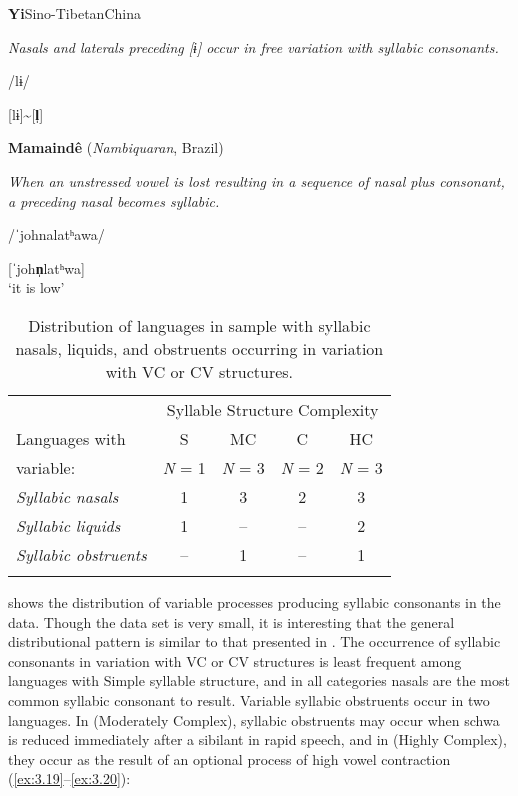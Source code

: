 \ea\label{ex:3.17}
 \textbf{Yi}{Sino-Tibetan}{China}

\textit{Nasals and laterals preceding [ɨ] occur in free variation with syllabic consonants.}

/lɨ/

[lɨ]{\textasciitilde}[\textbf{l̩}]
\citep[31]{Gerner2013}
\z

\ea\label{ex:3.18}
   \textbf{Mamaindê} (\textit{Nambiquaran}, Brazil)

\textit{When an unstressed vowel is lost resulting in a sequence of nasal plus consonant, a preceding nasal becomes syllabic.}

/ˈjohnalatʰawa/

[ˈjoh\textbf{n̩}latʰwa]\\
\glt ‘it is low’
\citep[262-263]{Eberhard2009}
\z

\begin{table}
\begin{tabular}{lcccc}
\lsptoprule
 & \multicolumn{4}{c}{Syllable Structure Complexity}\\\cmidrule(lr){2-5}
 Languages with  & S & MC & C & HC\\
   variable:     &   \textit{N} = 1 & \textit{N} = 3 &  \textit{N} = 2 & \textit{N} = 3\\\midrule
 \textit{Syllabic nasals}     & 1 & 3 & 2 & 3\\
 \textit{Syllabic liquids}    & 1 & -- & -- & 2\\
 \textit{Syllabic obstruents} & -- & 1 & -- & 1\\
\lspbottomrule
\end{tabular}
\caption{\label{tab:3.7}Distribution of languages in sample with syllabic nasals, liquids, and obstruents occurring in variation with VC or CV structures.}
\end{table}

   shows the distribution of variable processes producing syllabic consonants in the data. Though the data set is very small, it is interesting that the general distributional pattern is similar to that presented in . The occurrence of syllabic consonants in variation with VC or CV structures is least frequent among languages with Simple syllable structure, and in all categories nasals are the most common syllabic consonant to result. Variable syllabic obstruents occur in two languages. In  (Moderately Complex), syllabic obstruents may occur when schwa is reduced immediately after a sibilant in rapid speech, and in  (Highly Complex), they occur as the result of an optional process of high vowel contraction (\ref{ex:3.19}--\ref{ex:3.20}):

